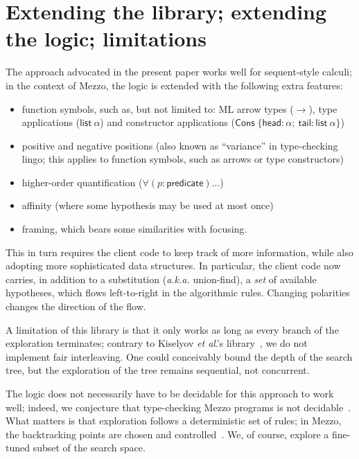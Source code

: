 \documentclass{easychair}
\begin{document}
\section{Extending the library; extending the logic; limitations}
\label{sec:extending}

The approach advocated in the present paper works well for sequent-style
calculi; in the context of Mezzo, the logic is extended with the following extra
features:
\begin{itemize}
  \item function symbols, such as, but not limited to: ML arrow types ($\to$),
    type applications ($\mathsf{list}\ \alpha$) and constructor applications
    ($\mathsf{Cons}\;\{ \mathsf{head}:\alpha;\ \mathsf{tail}:\mathsf{list}\
    \alpha\}$)
  \item positive and negative positions (also known as ``variance'' in
    type-checking lingo; this applies to function symbols, such as arrows or
    type constructors)
  \item higher-order quantification ($\forall (p: \mathsf{predicate}) \ldots$)
  \item affinity (where some hypothesis may be used at most once)
  \item framing, which bears some similarities with focusing.
\end{itemize}

This in turn requires the client code to keep track of more information, while
also adopting more sophisticated data structures. In particular, the client code
now carries, in addition to a substitution (\emph{a.k.a.} union-find), a
\emph{set} of available hypotheses, which flows left-to-right in the algorithmic
rules. Changing polarities changes the direction of the flow.

A limitation of this library is that it only works as long as every branch of
the exploration terminates; contrary to Kiselyov \emph{et al}.'s
library~\cite{oleg05}, we do not implement fair interleaving. One could
conceivably bound the depth of the search tree, but the exploration of the tree
remains sequential, not concurrent.

The logic does not necessarily have to be decidable for this approach to work
well; indeed, we conjecture that type-checking Mezzo programs is not
decidable~\cite[p.  167]{protzenko-phd-14}. What matters is that exploration
follows a deterministic set of rules; in Mezzo, the backtracking points are
chosen and controlled~\cite[p. 165]{protzenko-phd-14}. We, of course, explore a
fine-tuned subset of the search space.
\end{document}
